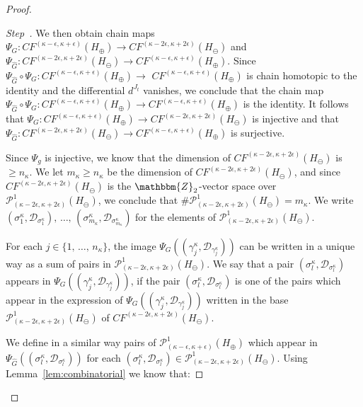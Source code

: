 \documentclass[AHL,Unicode,longabstracts,published]{cedram}
\newcommand{\Z}{\mathbbm{Z}}
\newcommand{\clP}{\mathcal{P}}
\newcommand{\clD}{\mathcal{D}}
\newcounter{stepcount}
\newenvironment{step}{\refstepcounter{stepcount}\begin{proof}[Step~\thestepcount]}{\let\qed\relax\end{proof}}
\begin{document}
\begin{proof}
\begin{step}
We then obtain chain maps $\Psi_G : CF^{(\kappa - \epsilon, \kappa+ \epsilon)}(H_\oplus) \to CF^{(\kappa - 2\epsilon, \kappa+ 2\epsilon)}(H_\ominus) $ and $\Psi_{\widehat{G}}:CF^{(\kappa - 2\epsilon, \kappa+ 2\epsilon)}(H_\ominus) \to CF^{(\kappa - \epsilon, \kappa+ \epsilon)}(H_\oplus)$. Since $\Psi_{\widehat{G}} \circ \Psi_G: CF^{(\kappa - \epsilon, \kappa+ \epsilon)}(H_\oplus) \to$ $ CF^{(\kappa - \epsilon, \kappa+ \epsilon)}(H_\oplus) $ is chain homotopic to the identity and the differential $d^{J_t}$ vanishes, we conclude that the chain map $\Psi_{\widehat{G}} \circ \Psi_G: CF^{(\kappa - \epsilon, \kappa+ \epsilon)}(H_\oplus) \to CF^{(\kappa - \epsilon, \kappa+ \epsilon)}(H_\oplus) $ is the identity. It follows that $\Psi_G: CF^{(\kappa - \epsilon, \kappa+ \epsilon)}(H_\oplus) \to CF^{(\kappa - 2\epsilon, \kappa+ 2\epsilon)}(H_\ominus) $ is injective and that $\Psi_{\widehat{G}}: CF^{(\kappa - 2\epsilon, \kappa+ 2\epsilon)}(H_\ominus) \to CF^{(\kappa - \epsilon, \kappa+ \epsilon)}(H_\oplus)$ is surjective.


Since $\Psi_g$ is injective, we know that the dimension of $CF^{(\kappa - 2\epsilon, \kappa+ 2\epsilon)}(H_\ominus)$ is $\geq n_\kappa$. We let $m_\kappa \geq n_\kappa$ be the dimension of $CF^{(\kappa - 2\epsilon, \kappa+ 2\epsilon)}(H_\ominus)$, and since $CF^{(\kappa - 2\epsilon, \kappa+ 2\epsilon)}(H_\ominus)$ is the $\Z_2$-vector space over $\clP^1_{(\kappa - 2\epsilon, \kappa+ 2\epsilon)}(H_\ominus)$, we conclude that $ \# \clP^1_{(\kappa - 2\epsilon, \kappa+ 2\epsilon)}(H_\ominus) = m_{\kappa}$. We write $(\sigma^\kappa_1,\clD_{\sigma^\kappa_1}),\,\ldots,\,(\sigma^\kappa_{m_\kappa},\clD_{\sigma^\kappa_{m_\kappa}})$ for the elements of $\clP^1_{(\kappa - 2\epsilon, \kappa+ 2\epsilon)}(H_\ominus)$.

For each $j\in \{1,\,\ldots,\,n_\kappa\}$, the image $\Psi_G((\gamma^\kappa_j,\clD_{\gamma^\kappa_j}))$ can be written in a unique way as a sum of pairs in $\clP^1_{(\kappa - 2\epsilon, \kappa+ 2\epsilon)}(H_\ominus)$. We say that a pair $(\sigma^\kappa_l,\clD_{\sigma^\kappa_l})$ appears in $\Psi_G((\gamma^\kappa_j,\clD_{\gamma^\kappa_j}))$, if the pair $(\sigma^\kappa_l,\clD_{\sigma^\kappa_l})$ is one of the pairs which appear in the expression of $\Psi_G((\gamma^\kappa_j,\clD_{\gamma^\kappa_j}))$ written in the base $\clP^1_{(\kappa - 2\epsilon, \kappa+ 2\epsilon)}(H_\ominus)$ of $CF^{(\kappa - 2\epsilon, \kappa+ 2\epsilon)}(H_\ominus)$.

We define in a similar way pairs of $\clP^1_{(\kappa - \epsilon, \kappa+ \epsilon)}(H_\oplus)$ which appear in $\Psi_{\widehat{G}}((\sigma^\kappa_l,\clD_{\sigma^\kappa_l}))$ for each $(\sigma^\kappa_l,\clD_{\sigma^\kappa_l})\in \clP^1_{(\kappa - 2\epsilon, \kappa+ 2\epsilon)}(H_\ominus)$. Using Lemma~\ref{lem:combinatorial} we know that:


\end{step}
\end{proof}
\end{document}
